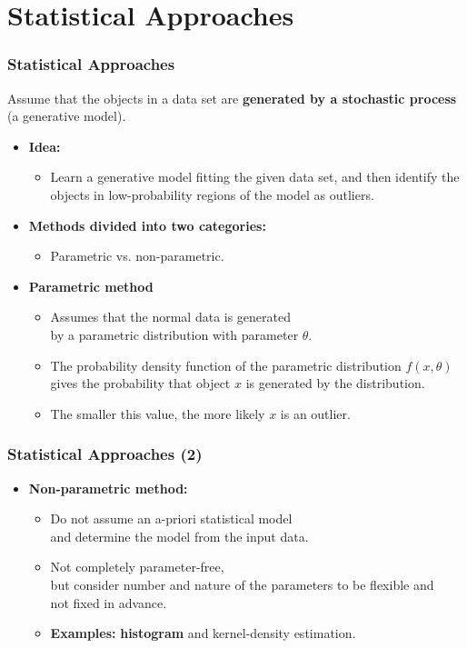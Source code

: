 \section{Statistical Approaches}


\begin{frame}
  \frametitle{Statistical Approaches}
  Assume that the objects in a data set are \textbf{\color{airforceblue}generated by a stochastic process} (a generative model).
  \begin{itemize}
  \item \textbf{Idea:}
    \begin{itemize}
    \item Learn a generative model fitting the given data set, and then identify the objects in low-probability regions of the model as outliers.
    \end{itemize}
  \item \textbf{Methods divided into two categories:}
    \begin{itemize}
    \item Parametric vs. non-parametric.
    \end{itemize}
  \item \textbf{Parametric method}
    \begin{itemize}
    \item Assumes that the normal data is generated \\
      by a parametric distribution with parameter $\theta$.
    \item The probability density function of the parametric distribution $f(x, \theta)$ \\
      gives the probability that object $x$ is generated by the distribution.
    \item The smaller this value, the more likely $x$ is an outlier.
    \end{itemize}
  \end{itemize}
\end{frame}


\begin{frame}
  \frametitle{Statistical Approaches (2)}
  \begin{itemize}
  \item \textbf{Non-parametric method:}
    \begin{itemize}
    \item Do not assume an a-priori statistical model \\
      and determine the model from the input data.
    \item Not completely parameter-free, \\
      but consider number and nature of the parameters to be flexible and \\ not fixed in advance.
    \item \textbf{Examples:} \textbf{\color{airforceblue}histogram} and kernel-density estimation.
    \end{itemize}
  \end{itemize}
\end{frame}


